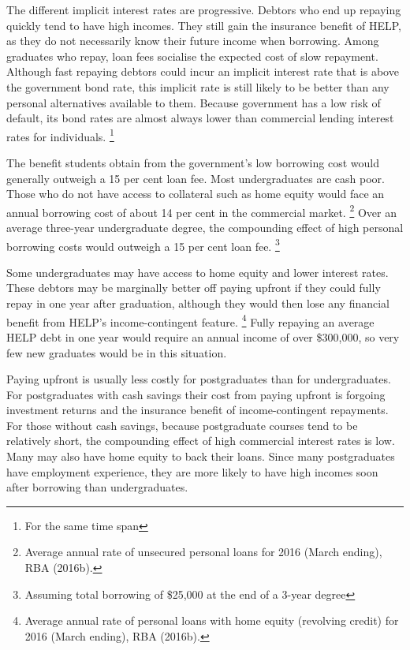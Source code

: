 \documentclass[embargoed]{grattan}
\begin{document}
The different implicit interest rates are progressive.
Debtors who end up repaying quickly tend to have high incomes.
They still gain the insurance benefit of HELP, as they do not necessarily know their future income when borrowing.
Among graduates who repay, loan fees socialise the expected cost of slow repayment.
Although fast repaying debtors could incur an implicit interest rate that is above the government bond rate, this implicit rate is still likely to be better than any personal alternatives available to them.
Because government has a low risk of default, its bond rates are almost always lower than commercial lending interest rates for individuals.%
\footnote{For the same time span}

The benefit students obtain from the government's low borrowing cost would generally outweigh a 15 per cent loan fee.
Most undergraduates are cash poor.
Those who do not have access to collateral such as home equity would face an annual borrowing cost of about 14 per cent in the commercial market.%
\footnote{Average annual rate of unsecured personal loans for 2016 (March ending), RBA (2016b).} Over an average three-year undergraduate degree, the compounding effect of high personal borrowing costs would outweigh a 15 per cent loan fee.%
\footnote{Assuming total borrowing of \$25,000 at the end of a 3-year degree}

Some undergraduates may have access to home equity and lower interest rates.
These debtors may be marginally better off paying upfront if they could fully repay in one year after graduation, although they would then lose any financial benefit from HELP's income-contingent feature.%
\footnote{Average annual rate of personal loans with home equity (revolving credit) for 2016 (March ending), RBA (2016b).} Fully repaying an average HELP debt in one year would require an annual income of over \$300,000, so very few new graduates would be in this situation.

Paying upfront is usually less costly for postgraduates than for undergraduates.
For postgraduates with cash savings their cost from paying upfront is forgoing investment returns and the insurance benefit of income-contingent repayments.
For those without cash savings, because postgraduate courses tend to be relatively short, the compounding effect of high commercial interest rates is low.
Many may also have home equity to back their loans.
Since many postgraduates have employment experience, they are more likely to have high incomes soon after borrowing than undergraduates.
\end{document}

